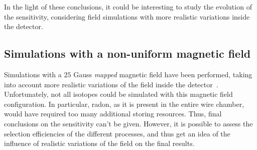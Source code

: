 In the light of these conclusions, it could be interesting to study the evolution of the sensitivity, considering field simulations with more realistic variations inside the detector.


\subsection{Simulations with a non-uniform magnetic field}
\label{subsec:mapped_field}

Simulations with a $25$ Gauss \emph{mapped} magnetic field have been performed, taking into account more realistic variations of the field inside the detector~\cite{docdb:map_magnetic_field2015}.
Unfortunately, not all isotopes could be simulated with this magnetic field configuration.
In particular, radon, as it is present in the entire wire chamber, would have required too many additional storing resources.
Thus, final conclusions on the sensitivity can't be given.
However, it is possible to assess the selection efficiencies of the different processes, and thus get an idea of the influence of realistic variations of the field on the final results.

